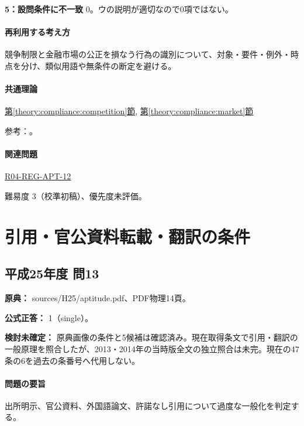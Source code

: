 \noindent\textbf{5：設問条件に不一致} 0。ウの説明が適切なので0項ではない。\par

\paragraph{再利用する考え方} 競争制限と金融市場の公正を損なう行為の識別について、対象・要件・例外・時点を分け、類似用語や無条件の断定を避ける。

\paragraph{共通理論} \hyperref[theory:compliance:competition]{第\ref*{theory:compliance:competition}節}, \hyperref[theory:compliance:market]{第\ref*{theory:compliance:market}節}

\par 参考：\cite{jftc_rules,jftc_bid_cartel2021,fsa_market2004,fsa_information}。

\paragraph{関連問題} \hyperref[q:r04-reg-apt-12]{R04-REG-APT-12}

\par 難易度 3（校準初稿）、優先度未評価。

\section{引用・官公資料転載・翻訳の条件}

\subsection{平成25年度 問13}
\label{q:h25-reg-apt-13}

\noindent\textbf{原典：} sources/H25/aptitude.pdf、PDF物理14頁。

\textbf{公式正答：} 1（single）。

\par\textbf{検討未確定：} 原典画像の条件と5候補は確認済み。現在取得条文で引用・翻訳の一般原理を照合したが、2013・2014年の当時版全文の独立照合は未完。現在の47条の6を過去の条番号へ代用しない。

\paragraph{問題の要旨} 出所明示、官公資料、外国語論文、許諾なし引用について過度な一般化を判定する。

